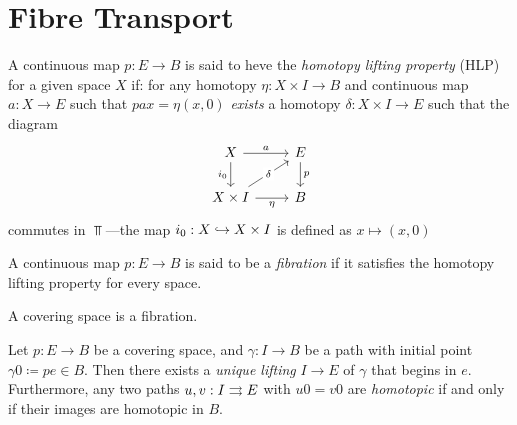 \section{Fibre Transport}

\begin{definition}
    \label{def:homotopy-lifting-property}
    A continuous map \(p: E \to B\) is said to heve the \emph{homotopy lifting
        property} (HLP) for a given space \(X\) if: for any homotopy \(\eta: X \times
    I \to B\) and continuous map \(a: X \to E\) such that \(p a x = \eta(x, 0)\)
    \emph{exists} a homotopy \(\delta: X \times I \to E\) such that the diagram
    \[
        \begin{tikzcd}
            X \ar[r, "a"] \ar[d, "i_0"']
            &E \ar[d, "p"] \\
            X \times I \ar[ru, "\delta" description]
            \ar[r, "\eta"']
            &B
        \end{tikzcd}
    \]
    commutes in \(\Top\)---the map \(i_0: X \hookrightarrow X \times I\) is defined as
    \(x \mapsto (x, 0)\)
\end{definition}


\begin{definition}[Fibration]
    \label{def:fibration}
    A continuous map \(p: E \to B\) is said to be a \emph{fibration} if it satisfies
    the homotopy lifting property for every space.
\end{definition}

\begin{theorem}
    \label{thm:coverings-are-fibrations}
    A covering space is a fibration.
\end{theorem}


\begin{proposition}
    \label{prop:path-lifting}
    Let \(p: E \to B\) be a covering space, and \(\gamma: I \to B\) be a path with
    initial point \(\gamma 0 \coloneq p e \in B\). Then there exists a \emph{unique
        lifting} \(I \to E\) of \(\gamma\) that begins in \(e\). Furthermore, any two
    paths \(u, v: I \rightrightarrows E\) with \(u 0 = v 0\) are \emph{homotopic} if and only if
    their images are homotopic in \(B\).
\end{proposition}

